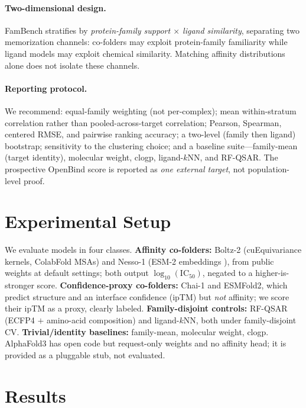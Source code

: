 \documentclass[11pt]{article}
\begin{document}
\paragraph{Two-dimensional design.} FamBench stratifies by \emph{protein-family support
$\times$ ligand similarity}, separating two memorization channels: co-folders may exploit
protein-family familiarity while ligand models may exploit chemical similarity. Matching affinity
distributions alone does not isolate these channels.

\paragraph{Reporting protocol.} We recommend: equal-family weighting (not per-complex);
mean within-stratum correlation rather than pooled-across-target correlation; Pearson, Spearman,
centered RMSE, and pairwise ranking accuracy; a two-level (family then ligand) bootstrap;
sensitivity to the clustering choice; and a baseline suite---family-mean (target identity),
molecular weight, clogp, ligand-$k$NN, and RF-QSAR. The prospective OpenBind score is reported as
\emph{one external target}, not population-level proof.

\section{Experimental Setup}

We evaluate models in four classes. \textbf{Affinity co-folders:} Boltz-2
\citep{passaro2025boltz2} (cuEquivariance kernels, ColabFold MSAs) and Nesso-1
\citep{valencelabs2026nesso1} (ESM-2 embeddings \citep{rives2021esm}), from public weights at
default settings; both output $\log_{10}(\text{IC}_{50})$, negated to a higher-is-stronger score.
\textbf{Confidence-proxy co-folders:} Chai-1 \citep{chai2024chai1} and ESMFold2, which predict
structure and an interface confidence (ipTM) but \emph{not} affinity; we score their ipTM as a
proxy, clearly labeled. \textbf{Family-disjoint controls:} RF-QSAR (ECFP4 $+$ amino-acid
composition) and ligand-$k$NN, both under family-disjoint CV. \textbf{Trivial/identity baselines:}
family-mean, molecular weight, clogp. AlphaFold3 has open code but request-only weights and no
affinity head; it is provided as a pluggable stub, not evaluated.

\section{Results}
\end{document}
